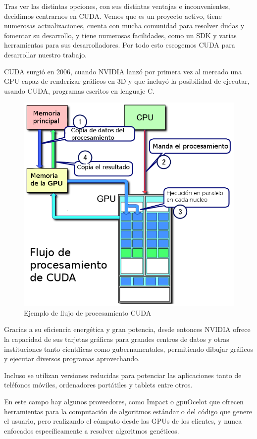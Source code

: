 Tras ver las distintas opciones, con sus distintas ventajas e inconvenientes, decidimos centrarnos en CUDA. Vemos que es un proyecto activo, tiene numerosas actualizaciones, cuenta con mucha comunidad para resolver dudas y fomentar su desarrollo, y tiene numerosas facilidades, como un SDK \cite{nvidiadeveloper} y varias herramientas para sus desarrolladores. Por todo esto escogemos CUDA para desarrollar nuestro trabajo.

\bigskip
CUDA surgió en 2006, cuando NVIDIA lanzó por primera vez al mercado una GPU capaz de renderizar gráficos en 3D y que incluyó la posibilidad de ejecutar, usando CUDA, programas escritos en lenguaje C.

\bigskip
\begin{figure}[h]
	\centering
	\includegraphics[width=0.6\linewidth]{../images/flujocuda}
	\caption[Ejemplo de flujo de procesamiento  CUDA]{Ejemplo de flujo de procesamiento CUDA}
	\label{fig:flujocuda}
\end{figure}


Gracias a su eficiencia energética y gran potencia, desde entonces NVIDIA ofrece la capacidad de sus tarjetas gráficas para grandes centros de datos y otras instituciones tanto científicas como gubernamentales, permitiendo dibujar gráficos y ejecutar diversos programas aprovechando.

Incluso se utilizan versiones reducidas para potenciar las aplicaciones tanto de teléfonos móviles, ordenadores portátiles y tablets entre
otros.


\bigskip
En este campo hay algunos proveedores, como Impact  \cite{cudaimpact} o gpuOcelot \cite{cudagpuocelot} que ofrecen herramientas para la computación de algoritmos estándar o del código que genere el usuario, pero  realizando el cómputo desde las GPUs de los clientes, y nunca enfocados específicamente a resolver algoritmos genéticos.

